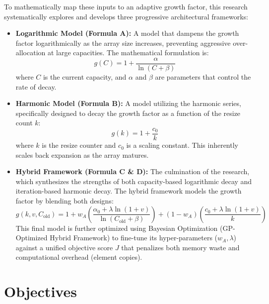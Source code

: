 To mathematically map these inputs to an adaptive growth factor, this research 
systematically explores and develops three progressive architectural frameworks:
\begin{itemize}
    \item \textbf{Logarithmic Model (Formula A):} A model that dampens the growth 
    factor logarithmically as the array size increases, preventing aggressive 
    over-allocation at large capacities. The mathematical formulation is:
    \begin{equation}
        g(C) = 1 + \frac{\alpha}{\ln(C + \beta)}
    \end{equation}
    where $C$ is the current capacity, and $\alpha$ and $\beta$ are parameters 
    that control the rate of decay.
    
    \item \textbf{Harmonic Model (Formula B):} A model utilizing the harmonic 
    series, specifically designed to decay the growth factor as a function of 
    the resize count $k$:
    \begin{equation}
        g(k) = 1 + \frac{c_0}{k}
    \end{equation}
    where $k$ is the resize counter and $c_0$ is a scaling constant. This inherently 
    scales back expansion as the array matures.
    
    \item \textbf{Hybrid Framework (Formula C \& D):} The culmination of the 
    research, which synthesizes the strengths of both capacity-based logarithmic 
    decay and iteration-based harmonic decay. The hybrid framework models the growth 
    factor by blending both designs:
    \begin{equation}
        g(k,v,C_{\text{old}}) = 1 + w_A \left( \frac{\alpha_0 + \lambda \ln(1+v)}{\ln(C_{\text{old}} + \beta)} \right) + (1 - w_A) \left( \frac{c_0 + \lambda \ln(1+v)}{k} \right)
    \end{equation}
    This final model is further optimized using Bayesian Optimization (GP-Optimized 
    Hybrid Framework) to fine-tune its hyper-parameters ($w_A, \lambda$) against 
    a unified objective score $J$ that penalizes both memory waste and computational 
    overhead (element copies).
\end{itemize}

\section{Objectives}

